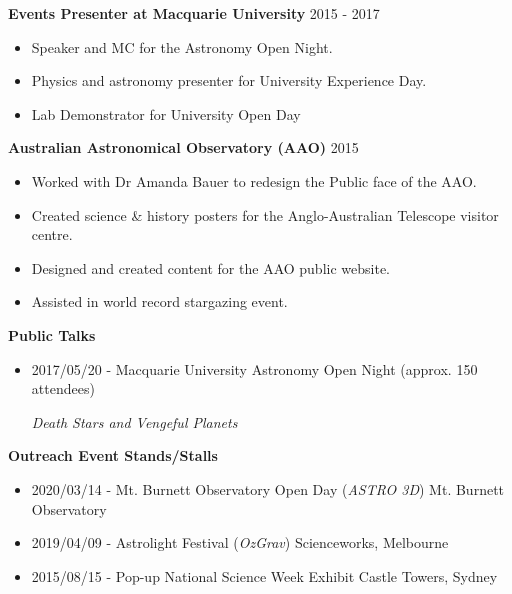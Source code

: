 \documentclass[11pt]{extarticle}
\begin{document}
\noindent
\textbf{Events Presenter at Macquarie University} \hfill 2015 - 2017 \par
{}
\begin{itemize}[noitemsep]
\item Speaker and MC for the Astronomy Open Night.
\item Physics and astronomy presenter for University Experience Day.
\item Lab Demonstrator for University Open Day
\end{itemize}

\noindent
\textbf{Australian Astronomical Observatory (AAO)} \hfill 2015 \par
{}
\begin{itemize}[noitemsep]
\item Worked with Dr Amanda Bauer to redesign the Public face of the AAO.
\item Created science \& history posters for the Anglo-Australian Telescope visitor centre.
\item Designed and created content for the AAO public website.
\item Assisted in world record stargazing event.
\end{itemize}

\noindent
\textbf{Public Talks} \par
\begin{itemize}[noitemsep]
\item 2017/05/20 - Macquarie University Astronomy Open Night (approx. 150 attendees) \par \emph{Death Stars and Vengeful Planets} 
\end{itemize}

\noindent
\textbf{Outreach Event Stands/Stalls} \par
\begin{itemize}[noitemsep]
\item 2020/03/14 - Mt. Burnett Observatory Open Day (\emph{ASTRO 3D}) \hfill Mt. Burnett Observatory  \par 
\item 2019/04/09 - Astrolight Festival (\emph{OzGrav}) \hfill Scienceworks, Melbourne \par
\item 2015/08/15 - Pop-up National Science Week Exhibit \hfill Castle Towers, Sydney \par
\end{itemize}
\end{document}

